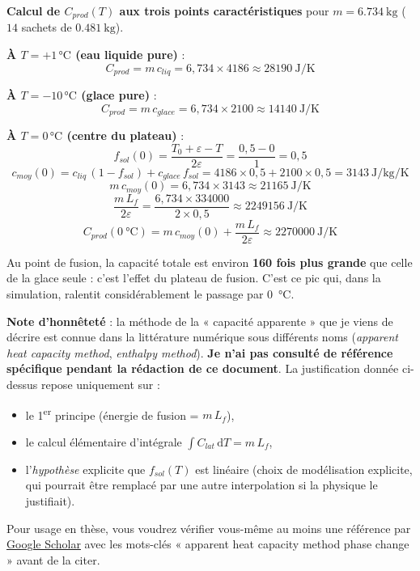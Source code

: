 \documentclass[11pt,a4paper]{article}
\begin{document}
\begin{exemple}
\textbf{Calcul de $C_{prod}(T)$ aux trois points caractéristiques} pour $m = \SI{6,734}{\kilogram}$
($14$ sachets de $\SI{0,481}{\kilogram}$).

\medskip
\textbf{À $T = +1\,\si{\celsius}$ (eau liquide pure)} :
$$C_{prod} = m\,c_{liq} = 6{,}734 \times 4186 \approx \SI{28190}{\joule\per\kelvin}$$

\textbf{À $T = -10\,\si{\celsius}$ (glace pure)} :
$$C_{prod} = m\,c_{glace} = 6{,}734 \times 2100 \approx \SI{14140}{\joule\per\kelvin}$$

\textbf{À $T = 0\,\si{\celsius}$ (centre du plateau)} :
$$f_{sol}(0) = \frac{T_0 + \varepsilon - T}{2\varepsilon} = \frac{0{,}5 - 0}{1} = 0{,}5$$
$$c_{moy}(0) = c_{liq}\,(1 - f_{sol}) + c_{glace}\,f_{sol} = 4186\times 0{,}5 + 2100\times 0{,}5 = \SI{3143}{\joule\per\kilogram\per\kelvin}$$
$$m\,c_{moy}(0) = 6{,}734 \times 3143 \approx \SI{21165}{\joule\per\kelvin}$$
$$\frac{m\,L_f}{2\varepsilon} = \frac{6{,}734 \times 334000}{2\times 0{,}5} \approx \SI{2249156}{\joule\per\kelvin}$$
$$C_{prod}(\SI{0}{\celsius}) = m\,c_{moy}(0) + \frac{m\,L_f}{2\varepsilon} \approx \SI{2270000}{\joule\per\kelvin}$$

Au point de fusion, la capacité totale est environ \textbf{160 fois plus grande} que celle
de la glace seule : c'est l'effet du plateau de fusion. C'est ce pic qui, dans la simulation,
ralentit considérablement le passage par \SI{0}{\celsius}.
\end{exemple}

\begin{honnete}
\textbf{Note d'honnêteté} : la méthode de la « capacité apparente » que je viens de décrire
est connue dans la littérature numérique sous différents noms (\emph{apparent heat capacity
method}, \emph{enthalpy method}). \textbf{Je n'ai pas consulté de référence spécifique
pendant la rédaction de ce document}. La justification donnée ci-dessus repose uniquement
sur :
\begin{itemize}[itemsep=0pt]
\item le 1\textsuperscript{er} principe (énergie de fusion = $m\,L_f$),
\item le calcul élémentaire d'intégrale $\int C_{lat}\,\mathrm{d}T = m\,L_f$,
\item l'\emph{hypothèse} explicite que $f_{sol}(T)$ est linéaire (choix de modélisation
explicite, qui pourrait être remplacé par une autre interpolation si la physique le
justifiait).
\end{itemize}
Pour usage en thèse, vous voudrez vérifier vous-même au moins une référence par
\href{https://scholar.google.com}{Google Scholar} avec les mots-clés
« apparent heat capacity method phase change » avant de la citer.
\end{honnete}
\end{document}
